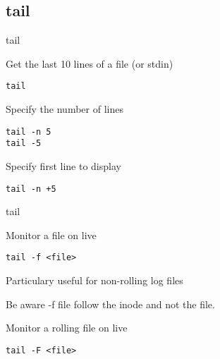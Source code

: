 \subsection{tail}

\begin{frame}[fragile]{tail}
  \begin{exampleblock}{Get the last 10 lines of a file (or stdin)}
    \begin{lstlisting}[showstringspaces=false,basicstyle=\tiny]
tail
    \end{lstlisting}
  \end{exampleblock}

  \pause
  \begin{exampleblock}{Specify the number of lines}
    \begin{lstlisting}[showstringspaces=false,basicstyle=\tiny]
tail -n 5
tail -5
    \end{lstlisting}
  \end{exampleblock}

  \pause
  \begin{exampleblock}{Specify first line to display}
    \begin{lstlisting}[showstringspaces=false,basicstyle=\tiny]
tail -n +5
    \end{lstlisting}
  \end{exampleblock}
\end{frame}


\begin{frame}[fragile]{tail}
  \begin{exampleblock}{Monitor a file on live}
    \begin{lstlisting}[showstringspaces=false,basicstyle=\tiny]
tail -f <file>
    \end{lstlisting}
  \end{exampleblock}
Particulary useful for non-rolling log files
\pause

Be aware -f file follow the inode and not the file.

  \pause
  \begin{exampleblock}{Monitor a rolling file on live}
    \begin{lstlisting}[showstringspaces=false,basicstyle=\tiny]
tail -F <file>
    \end{lstlisting}
  \end{exampleblock}


\end{frame}

